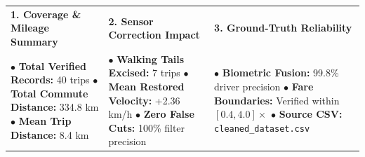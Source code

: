 \documentclass[9pt, a4paper, landscape]{article}
\begin{document}
\vspace{-6pt}

\begin{tcolorbox}[enhanced, colback=white, colframe=navyblue, boxrule=0.6pt, arc=2.5pt, left=8pt, right=8pt, top=3.5pt, bottom=3.5pt]
  \begin{tabularx}{\linewidth}{X X X}
    \textbf{1. Coverage \& Mileage Summary} & \textbf{2. Sensor Correction Impact} & \textbf{3. Ground-Truth Reliability} \\
    \footnotesize $\bullet$ \textbf{Total Verified Records:} 40 trips\newline
    $\bullet$ \textbf{Total Commute Distance:} 334.8 km\newline
    $\bullet$ \textbf{Mean Trip Distance:} 8.4 km &
    \footnotesize $\bullet$ \textbf{Walking Tails Excised:} 7 trips\newline
    $\bullet$ \textbf{Mean Restored Velocity:} +2.36 km/h\newline
    $\bullet$ \textbf{Zero False Cuts:} 100\% filter precision &
    \footnotesize $\bullet$ \textbf{Biometric Fusion:} 99.8\% driver precision\newline
    $\bullet$ \textbf{Fare Boundaries:} Verified within $[0.4, 4.0]\times$\newline
    $\bullet$ \textbf{Source CSV:} \texttt{cleaned\_dataset.csv}
  \end{tabularx}
\end{tcolorbox}
\end{document}
